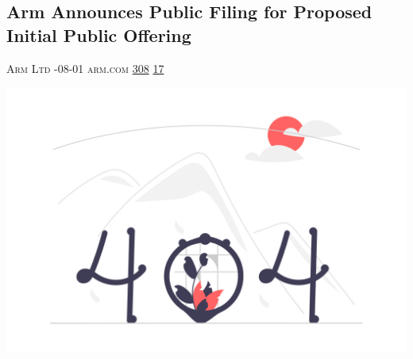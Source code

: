 \documentclass[10pt,a4paper]{article}
\begin{document}
\begin{multicols*}{2}
\begin{minipage}{\linewidth}
\subsection{Arm Announces Public Filing for Proposed Initial Public Offering}
\textsc{\footnotesize
{\scriptsize\faUser}\space 
Arm Ltd 
{\scriptsize\faCalendar}-08-01 
{\scriptsize\faGlobe}\space 
arm.com 
{\scriptsize\faThumbsOUp}\space 
\href{http://news.ycombinator.com/item?id=37219779\&utm\_term=comment}{308} 
{\scriptsize\faComments}\space 
\href{http://news.ycombinator.com/item?id=37219779\&utm\_term=comment}{17} 
}
\par\medskip\noindent
\href{https://www.arm.com/company/news/2023/08/arm-announces-public-filing-of-registration-statement-for-proposed-initial-public-offering?utm\_source=hackernewsletter\&utm\_medium=email\&utm\_term=startup\_news}{
    \includegraphics[width=0.99\linewidth]{notfound.png}
}
\end{minipage}

\end{multicols*}
\end{document}

